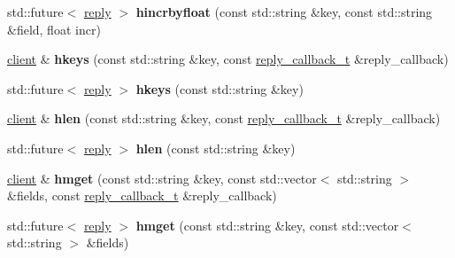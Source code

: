 \begin{DoxyCompactItemize}
\item 
\mbox{\label{classcpp__redis_1_1client_a6b856272a5956b3b2839c5b5749c9b97}} 
std\+::future$<$ \hyperlink{classcpp__redis_1_1reply}{reply} $>$ {\bfseries hincrbyfloat} (const std\+::string \&key, const std\+::string \&field, float incr)
\item 
\mbox{\label{classcpp__redis_1_1client_a432f322ff1818fa65208725b1be7f4d2}} 
\hyperlink{classcpp__redis_1_1client}{client} \& {\bfseries hkeys} (const std\+::string \&key, const \hyperlink{classcpp__redis_1_1client_a061a1140d36d2eaeda82b09a0bb3f9f2}{reply\+\_\+callback\+\_\+t} \&reply\+\_\+callback)
\item 
\mbox{\label{classcpp__redis_1_1client_a578dade240f8fbbd6ba797bff9be18dd}} 
std\+::future$<$ \hyperlink{classcpp__redis_1_1reply}{reply} $>$ {\bfseries hkeys} (const std\+::string \&key)
\item 
\mbox{\label{classcpp__redis_1_1client_a88b88d74f77f2a59bc75b7d1fcdbd483}} 
\hyperlink{classcpp__redis_1_1client}{client} \& {\bfseries hlen} (const std\+::string \&key, const \hyperlink{classcpp__redis_1_1client_a061a1140d36d2eaeda82b09a0bb3f9f2}{reply\+\_\+callback\+\_\+t} \&reply\+\_\+callback)
\item 
\mbox{\label{classcpp__redis_1_1client_a34b5783e7392f29dd26c6e114d535221}} 
std\+::future$<$ \hyperlink{classcpp__redis_1_1reply}{reply} $>$ {\bfseries hlen} (const std\+::string \&key)
\item 
\mbox{\label{classcpp__redis_1_1client_aac28715b6b151dd96ddb760fcc490c3c}} 
\hyperlink{classcpp__redis_1_1client}{client} \& {\bfseries hmget} (const std\+::string \&key, const std\+::vector$<$ std\+::string $>$ \&fields, const \hyperlink{classcpp__redis_1_1client_a061a1140d36d2eaeda82b09a0bb3f9f2}{reply\+\_\+callback\+\_\+t} \&reply\+\_\+callback)
\item 
\mbox{\label{classcpp__redis_1_1client_a8e3af68988204e491ada35efaaf9b247}} 
std\+::future$<$ \hyperlink{classcpp__redis_1_1reply}{reply} $>$ {\bfseries hmget} (const std\+::string \&key, const std\+::vector$<$ std\+::string $>$ \&fields)

\end{DoxyCompactItemize}
